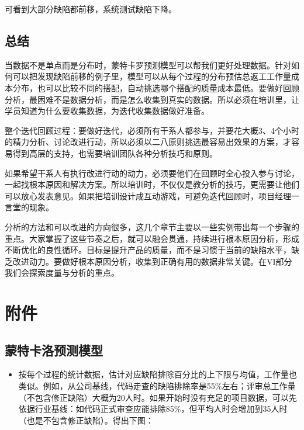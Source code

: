 可看到大部分缺陷都前移，系统测试缺陷下降。

\hypertarget{ux603bux7ed3}{%
\subsection{总结}\label{ux603bux7ed3}}

当数据不是单点而是分布时，蒙特卡罗预测模型可以帮我们更好处理数据。针对如何可以把发现缺陷前移的例子里，模型可以从每个过程的分布预估总返工工作量成本分布，也可以比较不同的搭配，自动挑选哪个搭配的质量成本最低。要做好回顾分析，最困难不是数据分析，而是怎么收集到真实的数据。所以必须在培训里，让学员知道为什么要收集数据，为迭代收集数据做好准备。

整个迭代回顾过程：要做好迭代，必须所有干系人都参与，并要花大概3、4个小时的精力分析、讨论改进行动，所以必须以二八原则挑选最容易出效果的方案，才容易得到高层的支持，也需要培训团队各种分析技巧和原则。

如果希望干系人有执行改进行动的动力，必须要他们在回顾时全心投入参与讨论，一起找根本原因和解决方案。所以培训时，不仅仅是教分析的技巧，更需要让他们可以放心发表意见。如果把培训设计成互动游戏，可避免迭代回顾时，项目经理一言堂的现象。

分析的方法和可以改进的方向很多，这几个章节主要以一些实例带出每一个步骤的重点。大家掌握了这些节奏之后，就可以融会贯通，持续进行根本原因分析，形成不断优化的良性循环。目标是提升产品的质量，而不是习惯于当前的缺陷水平，缺乏改进动力。要做好根本原因分析，收集到正确有用的数据非常关键。在VI部分我们会探索度量与分析的重点。

\hypertarget{ux9644ux4ef6}{%
\section{附件}\label{ux9644ux4ef6}}

\hypertarget{ux6c34ux6676ux7403ux8499ux5730ux5361ux7f57ux9884ux6d4bux6a21ux578b}{%
\subsection{蒙特卡洛预测模型}\label{ux6c34ux6676ux7403ux8499ux5730ux5361ux7f57ux9884ux6d4bux6a21ux578b}}

\begin{itemize}
\tightlist
\item
  按每个过程的统计数据，估计对应缺陷排除百分比的上下限与均值，工作量也类似。例如，从公司基线，代码走查的缺陷排除率是55\%左右；评审总工作量（不包含修正缺陷）大概为20人时。如果开始时没有充足的项目数据，可以先依据行业基线：如代码正式审查应能排除85\%，但平均人时会增加到35人时
  （也是不包含修正缺陷）。得出下图：
\end{itemize}

